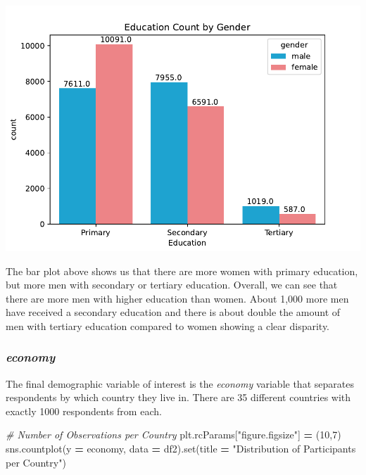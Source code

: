 \documentclass[water,article,submit,moreauthors,pdftex]{mdpi}
\newenvironment{Shaded}{\begin{snugshade}}{\end{snugshade}}
\newcommand{\BuiltInTok}[1]{#1}
\newcommand{\CommentTok}[1]{\textcolor[rgb]{0.56,0.35,0.01}{\textit{#1}}}
\newcommand{\DecValTok}[1]{\textcolor[rgb]{0.00,0.00,0.81}{#1}}
\newcommand{\NormalTok}[1]{#1}
\newcommand{\OperatorTok}[1]{\textcolor[rgb]{0.81,0.36,0.00}{\textbf{#1}}}
\newcommand{\StringTok}[1]{\textcolor[rgb]{0.31,0.60,0.02}{#1}}
\begin{document}
\includegraphics{term_paper_files/figure-latex/unnamed-chunk-7-3.pdf}

The bar plot above shows us that there are more women with primary
education, but more men with secondary or tertiary education. Overall,
we can see that there are more men with higher education than women.
About 1,000 more men have received a secondary education and there is
about double the amount of men with tertiary education compared to women
showing a clear disparity.

\hypertarget{economy}{%
\subsubsection{\texorpdfstring{\emph{economy}}{economy}}\label{economy}}

The final demographic variable of interest is the \emph{economy}
variable that separates respondents by which country they live in. There
are 35 different countries with exactly 1000 respondents from each.

\begin{Shaded}
\begin{Highlighting}[]
\CommentTok{\# Number of Observations per Country}
\NormalTok{plt.rcParams[}\StringTok{"figure.figsize"}\NormalTok{] }\OperatorTok{=}\NormalTok{ (}\DecValTok{10}\NormalTok{,}\DecValTok{7}\NormalTok{)}
\NormalTok{sns.countplot(y }\OperatorTok{=} \StringTok{\textquotesingle{}economy\textquotesingle{}}\NormalTok{, data }\OperatorTok{=}\NormalTok{ df2).}\BuiltInTok{set}\NormalTok{(title }\OperatorTok{=} \StringTok{"Distribution of Participants per Country"}\NormalTok{)}
\end{Highlighting}
\end{Shaded}
\end{document}
